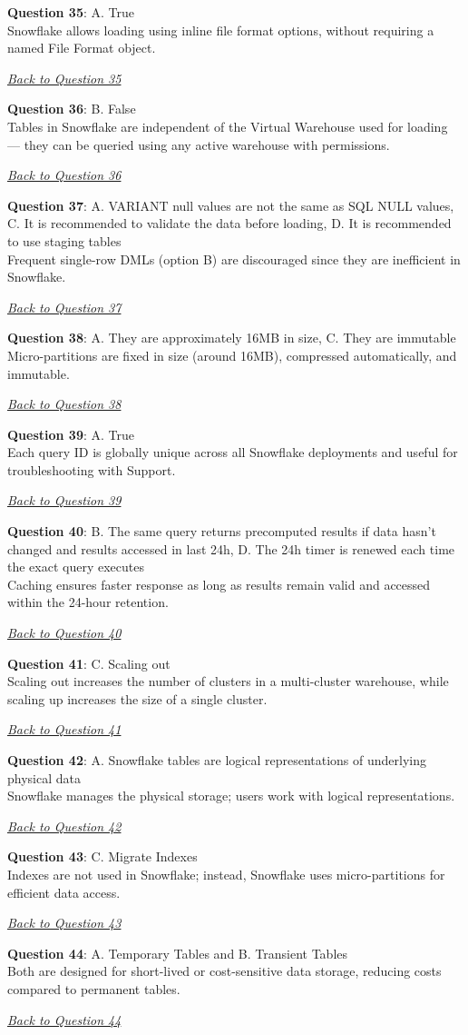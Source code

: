 \documentclass[12pt]{article}
\newcommand{\answer}[2]{%
  \textbf{Question #1}\label{ans:#1}: #2\par
  \smallskip\emph{\hyperref[q:#1]{Back to Question #1}}\par\medskip
}
\begin{document}
\answer{35}{A. True \\
Snowflake allows loading using inline file format options, without requiring a named File Format object.}

\answer{36}{B. False \\
Tables in Snowflake are independent of the Virtual Warehouse used for loading — they can be queried using any active warehouse with permissions.}

\answer{37}{A. VARIANT null values are not the same as SQL NULL values, 
C. It is recommended to validate the data before loading, 
D. It is recommended to use staging tables \\
Frequent single-row DMLs (option B) are discouraged since they are inefficient in Snowflake.}

\answer{38}{A. They are approximately 16MB in size, C. They are immutable \\
Micro-partitions are fixed in size (around 16MB), compressed automatically, and immutable.}

\answer{39}{A. True \\
Each query ID is globally unique across all Snowflake deployments and useful for troubleshooting with Support.}

\answer{40}{B. The same query returns precomputed results if data hasn’t changed and results accessed in last 24h, 
D. The 24h timer is renewed each time the exact query executes \\
Caching ensures faster response as long as results remain valid and accessed within the 24-hour retention.}

\answer{41}{C. Scaling out \\
Scaling out increases the number of clusters in a multi-cluster warehouse, while scaling up increases the size of a single cluster.}

\answer{42}{A. Snowflake tables are logical representations of underlying physical data \\
Snowflake manages the physical storage; users work with logical representations.}

\answer{43}{C. Migrate Indexes \\
Indexes are not used in Snowflake; instead, Snowflake uses micro-partitions for efficient data access.}

\answer{44}{A. Temporary Tables and B. Transient Tables \\
Both are designed for short-lived or cost-sensitive data storage, reducing costs compared to permanent tables.}
\end{document}
